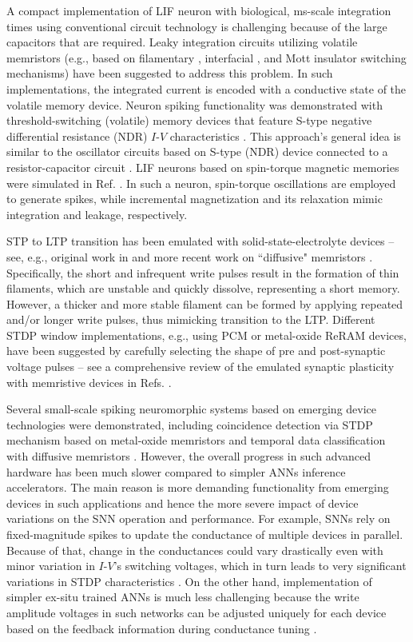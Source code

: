 A compact implementation of LIF neuron with biological, ms-scale integration times using conventional circuit technology is challenging because of the large capacitors that are required. Leaky integration circuits utilizing volatile memristors (e.g., based on filamentary \cite{Zhang2018Small}, interfacial \cite{Lashkare2018}, and Mott insulator \cite{Adda2018} switching mechanisms) have been suggested to address this problem. In such implementations, the integrated current is encoded with a conductive state of the volatile memory device. Neuron spiking functionality was demonstrated with threshold-switching (volatile) memory devices that feature S-type negative differential resistance (NDR) $I$-$V$ characteristics \cite{Pickett2013}. This approach's general idea is similar to the oscillator circuits based on S-type (NDR) device connected to a resistor-capacitor circuit \cite{Kesim2019}. LIF neurons based on spin-torque magnetic memories were simulated in Ref. \cite{Sengupta2016}. In such a neuron,  spin-torque oscillations are employed to generate spikes, while incremental magnetization and its relaxation mimic integration and leakage, respectively.

STP to LTP transition has been emulated with solid-state-electrolyte devices – see, e.g., original work in \cite{Ohno2011} and more recent work on ``diffusive" memristors \cite{Wang2017NatMat}. Specifically, the short and infrequent write pulses result in the formation of thin filaments, which are unstable and quickly dissolve, representing a short memory. However, a thicker and more stable filament can be formed by applying repeated and/or longer write pulses, thus mimicking transition to the LTP.  Different STDP window implementations, e.g., using PCM \cite{Kuzum2011} or metal-oxide ReRAM \cite{Prezioso2016} devices, have been suggested by carefully selecting the shape of pre and post-synaptic voltage pulses – see a comprehensive review of the emulated synaptic plasticity with memristive devices in Refs. \cite{Serrano-Gotarredona2013, Saighi2015}.

Several small-scale spiking neuromorphic systems based on emerging device technologies were demonstrated, including coincidence detection via STDP mechanism based on metal-oxide memristors \cite{Prezioso2018, Pedretti2017} and temporal data classification with diffusive memristors \cite{Wang2018NatElec}.  However, the overall progress in such advanced hardware has been much slower compared to simpler ANNs inference accelerators. The main reason is more demanding functionality from emerging devices in such applications and hence the more severe impact of device variations on the SNN operation and performance. For example, SNNs rely on fixed-magnitude spikes to update the conductance of multiple devices in parallel. Because of that, change in the conductances could vary drastically even with minor variation in $I$-$V$'s switching voltages, which in turn leads to very significant variations in STDP characteristics \cite{Prezioso2018}. On the other hand, implementation of simpler ex-situ trained ANNs is much less challenging because the write amplitude voltages in such networks can be adjusted uniquely for each device based on the feedback information during conductance tuning \cite{Alibart2012}. 

